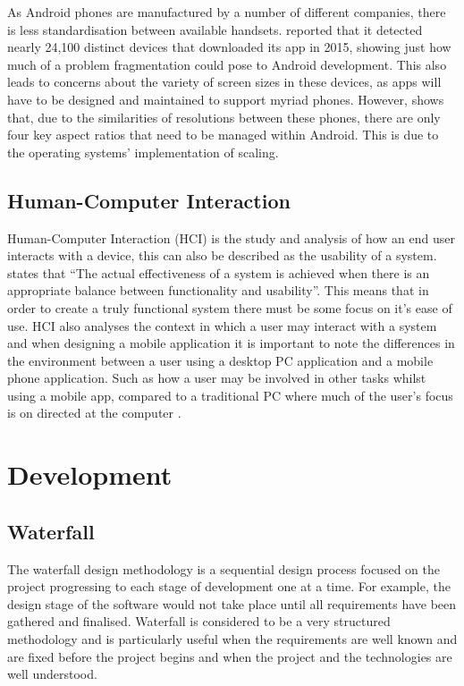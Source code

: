 As Android phones are manufactured by a number of different companies, there is less standardisation between available handsets. 
\cite{uniqueandroiddevices} reported that it detected nearly 24,100 distinct devices that downloaded its app in 2015, showing just how much of a problem fragmentation could pose to Android development.
This also leads to concerns about the variety of screen sizes in these devices, as apps will have to be designed and maintained to support myriad phones. 
However, \cite{androidscreenfragmentation} shows that, due to the similarities of resolutions between these phones, there are only four key aspect ratios that need to be managed within Android. This is due to the operating systems' implementation of scaling.

\subsection{Human-Computer Interaction}
Human-Computer Interaction (HCI) is the study and analysis of how an end user interacts with a device, this can also be described as the usability of a system.
\citet[p.118]{nielsen1994usability} states that ``The actual effectiveness of a system is achieved when there is an appropriate balance between functionality and usability''.
This means that in order to create a truly functional system there must be some focus on it's ease of use.
HCI also analyses the context in which a user may interact with a system and when designing a mobile application it is important to note the differences in the environment between a user using a desktop PC application and a mobile phone application.
Such as how a user may be involved in other tasks whilst using a mobile app, compared to a traditional PC where much of the user's focus is on directed at the computer \citep{kristoffersen1999making}. 

\section{Development}
\subsection{Waterfall}
The waterfall design methodology is a sequential design process focused on the project progressing to each stage of development one at a time. 
For example, the design stage of the software would not take place until all requirements have been gathered and finalised.
Waterfall is considered to be a very structured methodology and is particularly useful when the requirements are well known and are fixed before the project begins and when the project and the technologies are well understood.

